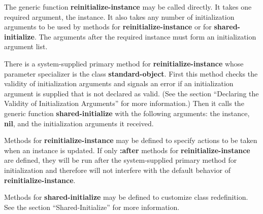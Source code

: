 The generic function {\bf reinitialize-instance} may be called
directly.  It takes one required argument, the instance.  It also
takes any number of initialization arguments to be used by methods for
{\bf reinitialize-instance} or for {\bf shared-initialize}. The
arguments after the required instance must form an initialization
argument list.

There is a system-supplied primary method for {\bf
reinitialize-instance} whose parameter specializer is the class {\bf
standard-object}.  First this method checks the validity of
initialization arguments and signals an error if an initialization
argument is supplied that is not declared as valid. (See the section
``Declaring the Validity of Initialization Arguments'' for more
information.)  Then it calls the generic function {\bf
shared-initialize} with the following arguments: the instance, {\bf
nil}, and the initialization arguments it received.


Methods for {\bf reinitialize-instance} may be defined to specify
actions to be taken when an instance is updated.  If only {\bf :after}
methods for {\bf reinitialize-instance} are defined, they will be run
after the system-supplied primary method for initialization and
therefore will not interfere with the default behavior of {\bf
reinitialize-instance}.

Methods for {\bf shared-initialize} may be defined to customize class
redefinition.  See the section ``Shared-Initialize'' for more
information.

\endsubSection%

\endSection%

\endChapter
\bye
